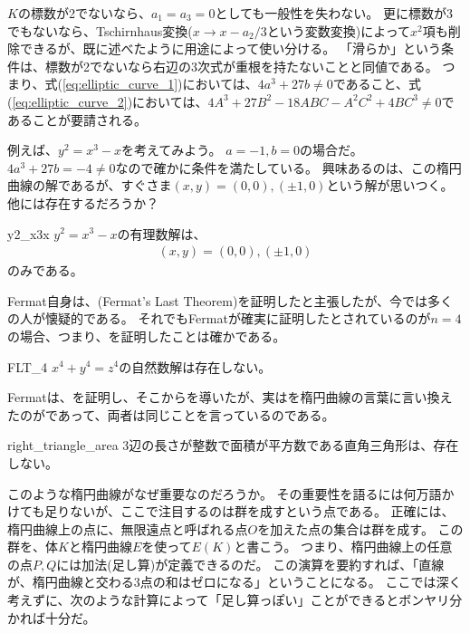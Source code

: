 $K$の標数が2でないなら、$a_1 = a_3 = 0$としても一般性を失わない。
更に標数が3でもないなら、Tschirnhaus変換($x\to x-a_2/3$という変数変換)によって$x^2$項も削除できるが、既に述べたように用途によって使い分ける。
「滑らか」という条件は、標数が2でないなら右辺の3次式が重根を持たないことと同値である。
つまり、式(\ref{eq:elliptic_curve_1})においては、$4a^3+27b\neq0$であること、式(\ref{eq:elliptic_curve_2})においては、$4A^3+27B^2-18ABC-A^2C^2 + 4BC^3\neq0$であることが要請される。

例えば、$y^2=x^3-x$を考えてみよう。
$a=-1,b=0$の場合だ。
$4a^3+27b=-4\neq0$なので確かに条件を満たしている。
興味あるのは、この楕円曲線の解であるが、すぐさま$(x,y)=(0,0),(\pm1,0)$という解が思いつく。
他には存在するだろうか？

\begin{Prop}{}{y2_x3x}
$y^2=x^3-x$の有理数解は、
\begin{align*}
(x,y) = (0,0), (\pm1, 0)
\end{align*}
のみである。
\end{Prop}

Fermat自身は、(Fermat's Last Theorem)を証明したと主張したが、今では多くの人が懐疑的である。
それでもFermatが確実に証明したとされているのが$n=4$の場合、つまり、を証明したことは確かである。

\begin{Prop}{}{FLT_4}
$x^4+y^4=z^4$の自然数解は存在しない。
\end{Prop}

Fermatは、を証明し、そこからを導いたが、実はを楕円曲線の言葉に言い換えたのがであって、両者は同じことを言っているのである。

\begin{Prop}{}{right_triangle_area}
3辺の長さが整数で面積が平方数である直角三角形は、存在しない。
\end{Prop}

このような楕円曲線がなぜ重要なのだろうか。
その重要性を語るには何万語かけても足りないが、ここで注目するのは群を成すという点である。
正確には、楕円曲線上の点に、無限遠点と呼ばれる点$O$を加えた点の集合は群を成す。
この群を、体$K$と楕円曲線$E$を使って$E(K)$と書こう。
つまり、楕円曲線上の任意の点$P,Q$には加法(足し算)が定義できるのだ。
この演算を要約すれば、「直線が、楕円曲線と交わる3点の和はゼロになる」ということになる。
ここでは深く考えずに、次のような計算によって「足し算っぽい」ことができるとボンヤリ分かれば十分だ。

